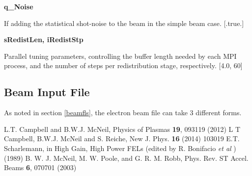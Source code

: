 \documentclass[12pt]{article}%
\begin{document}
{\bf q\_Noise}

If adding the statistical shot-noise to the beam in the simple beam case. [.true.]

{\bf sRedistLen, iRedistStp}

Parallel tuning parameters, controlling the buffer length needed by each MPI process, and the number of steps per redistribution stage, respectively. [4.0, 60]

\newpage

\subsection{Beam Input File}

As noted in section \ref{beamfls}, the electron beam file can take 3 different forms.


\newpage

\begin{thebibliography}{10}

L.T. Campbell and B.W.J. McNeil, Physics of Plasmas {\bf 19}, 093119 (2012)
L T Campbell, B.W.J. McNeil and S. Reiche, New J. Phys. {\bf 16} (2014) 103019
E.T. Scharlemann, in High Gain, High Power FELs (edited by R. Bonifacio \textit{et al} ) (1989)
B. W. J. McNeil, M. W. Poole, and G. R. M. Robb, Phys. Rev. ST Accel. Beams {\bf 6}, 070701 (2003)


\end{thebibliography}
\end{document}

